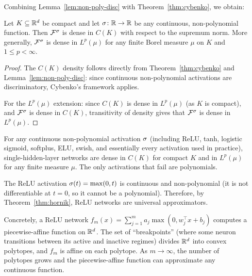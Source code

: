\documentclass[11pt,a4paper]{article}
\begin{document}
Combining Lemma~\ref{lem:non-poly-disc} with Theorem~\ref{thm:cybenko},
we obtain:

\begin{theorem}
\label{thm:hornik}
Let $K \subseteq \mathbb{R}^d$ be compact and let $\sigma \colon \mathbb{R} \to \mathbb{R}$ be
any continuous, non-polynomial function.  Then $\mathcal{F}^{\sigma}$ is dense
in $C(K)$ with respect to the supremum norm.  More generally,
$\mathcal{F}^{\sigma}$ is dense in $L^p(\mu)$ for any finite Borel measure
$\mu$ on $K$ and $1 \le p < \infty$.
\end{theorem}

\begin{proof}
The $C(K)$ density follows directly from Theorem~\ref{thm:cybenko}
and Lemma~\ref{lem:non-poly-disc}: since continuous non-polynomial
activations are discriminatory, Cybenko's framework applies.

For the $L^p(\mu)$ extension: since $C(K)$ is dense in $L^p(\mu)$ (as
$K$ is compact), and $\mathcal{F}^{\sigma}$ is dense in $C(K)$, transitivity
of density gives that $\mathcal{F}^{\sigma}$ is dense in $L^p(\mu)$.
\end{proof}

\begin{keyresult}[title={Hornik's Universal Approximation Theorem}]
For any continuous non-polynomial activation $\sigma$ (including ReLU,
tanh, logistic sigmoid, softplus, ELU, swish, and essentially every
activation used in practice), single-hidden-layer networks are dense in
$C(K)$ for compact $K$ and in $L^p(\mu)$ for any finite measure $\mu$.
The only activations that fail are polynomials.
\end{keyresult}

\begin{example}
\label{ex:relu-universal}
The ReLU activation $\sigma(t) = \max(0, t)$ is continuous and
non-polynomial (it is not differentiable at $t = 0$, so it cannot be a
polynomial).  Therefore, by Theorem~\ref{thm:hornik}, ReLU networks are
universal approximators.

Concretely, a ReLU network $f_m(x) = \sum_{j=1}^m a_j \max(0, w_j^\top x
+ b_j)$ computes a piecewise-affine function on $\mathbb{R}^d$.  The set of
``breakpoints'' (where some neuron transitions between its active and
inactive regimes) divides $\mathbb{R}^d$ into convex polytopes, and $f_m$ is affine
on each polytope.  As $m \to \infty$, the number of polytopes grows and
the piecewise-affine function can approximate any continuous function.
\end{example}
\end{document}
